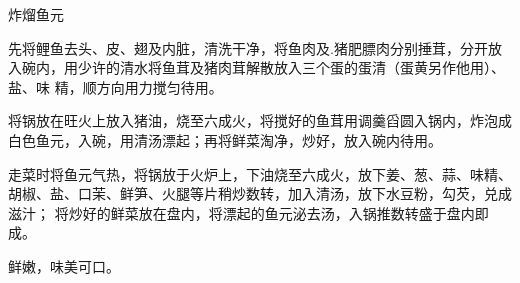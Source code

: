 \begin{recipe}{炸熘鱼元}

\ingredients


\preparation

\step 先将鲤鱼去头、皮、翅及内脏，清洗干净，将鱼肉及.猪肥膘肉分别捶茸，分开放
入碗内，用少许的清水将鱼茸及猪肉茸解散放入三个蛋的蛋清（蛋黄另作他用）、盐、味
精，顺方向用力搅匀待用。

\step 将锅放在旺火上放入猪油，烧至六成火，将搅好的鱼茸用调羹舀圆入锅内，炸泡成
白色鱼元，入碗，用清汤漂起；再将鲜菜淘净，炒好，放入碗内待用。

\step 走菜时将鱼元气热，将锅放于火炉上，下油烧至六成火，放下姜、葱、蒜、味精、
胡椒、盐、口茉、鲜笋、火腿等片稍炒数转，加入清汤，放下水豆粉，勾芡，兑成滋汁；
将炒好的鲜菜放在盘内，将漂起的鱼元泌去汤，入锅推数转盛于盘内即成。

\features

鲜嫩，味美可口。

\end{recipe}

